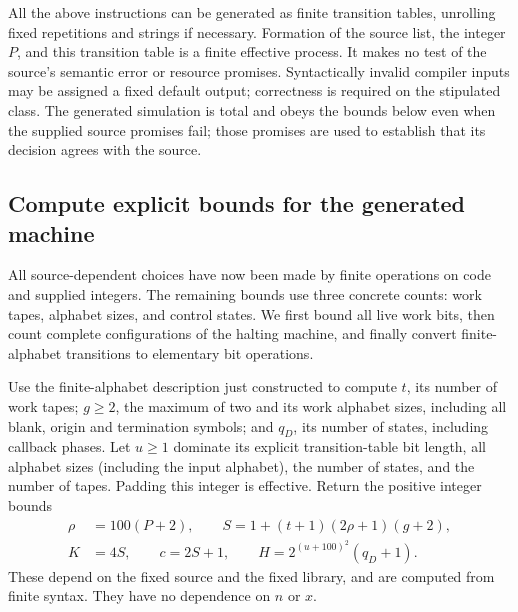 All the above instructions can be generated as finite transition tables,
unrolling fixed repetitions and strings if necessary.  Formation of the
source list, the integer $P$, and this transition table is a finite
effective process.  It makes no test of the source's semantic error or
resource promises.  Syntactically invalid compiler inputs may be assigned
a fixed default output; correctness is required on the stipulated class.
The generated simulation is total and obeys the bounds below even when
the supplied source promises fail; those promises are used to establish
that its decision agrees with the source.

\subsection{Compute explicit bounds for the generated machine}
\label{subsec:compiler-bounds}

All source-dependent choices have now been made by finite operations on code and supplied integers. The remaining bounds use three concrete counts: work tapes, alphabet sizes, and control states. We first bound all live work bits, then count complete configurations of the halting machine, and finally convert finite-alphabet transitions to elementary bit operations.

Use the finite-alphabet description just constructed to compute $t$, its
number of work tapes; $g\ge2$, the maximum of two and its work alphabet
sizes, including all blank, origin and termination symbols; and $q_D$,
its number of states, including callback phases.  Let $u\ge1$ dominate
its explicit transition-table bit length, all alphabet sizes (including
the input alphabet), the number of states, and the number of tapes.
Padding this integer is effective.  Return the positive integer bounds
\begin{equation}\label{eq:compiler-output-bounds}
 \begin{split}
 \rho&=100(P+2),\qquad
 S=1+(t+1)(2\rho+1)(g+2),\\
 K&=4S,\qquad c=2S+1,\qquad
 H=2^{(u+100)^2}(q_D+1).
 \end{split}
\end{equation}
These depend on the fixed source and the fixed library, and are computed
from finite syntax.  They have no dependence on $n$ or $x$.

